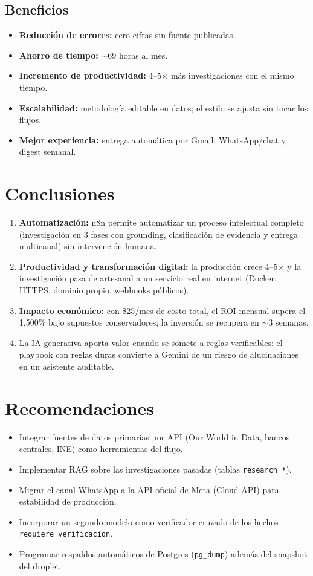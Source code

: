 \documentclass[11pt,a4paper]{article}
\newcommand{\code}[1]{\texttt{\small #1}}
\begin{document}
\subsection{Beneficios}
\begin{itemize}[leftmargin=1.4em]
\item \textbf{Reducción de errores:} cero cifras sin fuente publicadas.
\item \textbf{Ahorro de tiempo:} $\sim$69 horas al mes.
\item \textbf{Incremento de productividad:} 4--5$\times$ más investigaciones con el mismo tiempo.
\item \textbf{Escalabilidad:} metodología editable en datos; el estilo se ajusta sin tocar los flujos.
\item \textbf{Mejor experiencia:} entrega automática por Gmail, WhatsApp/chat y digest semanal.
\end{itemize}

\section{Conclusiones}
\begin{enumerate}[leftmargin=1.6em]
\item \textbf{Automatización:} n8n permite automatizar un proceso intelectual completo (investigación en 3 fases con grounding, clasificación de evidencia y entrega multicanal) sin intervención humana.
\item \textbf{Productividad y transformación digital:} la producción crece 4--5$\times$ y la investigación pasa de artesanal a un servicio real en internet (Docker, HTTPS, dominio propio, webhooks públicos).
\item \textbf{Impacto económico:} con \$25/mes de costo total, el ROI mensual supera el 1{,}500\% bajo supuestos conservadores; la inversión se recupera en $\sim$3 semanas.
\item La IA generativa aporta valor cuando se somete a reglas verificables: el playbook con reglas duras convierte a Gemini de un riesgo de alucinaciones en un asistente auditable.
\end{enumerate}

\section{Recomendaciones}
\begin{itemize}[leftmargin=1.4em]
\item Integrar fuentes de datos primarias por API (Our World in Data, bancos centrales, INE) como herramientas del flujo.
\item Implementar RAG sobre las investigaciones pasadas (tablas \code{research\_*}).
\item Migrar el canal WhatsApp a la API oficial de Meta (Cloud API) para estabilidad de producción.
\item Incorporar un segundo modelo como verificador cruzado de los hechos \code{requiere\_verificacion}.
\item Programar respaldos automáticos de Postgres (\code{pg\_dump}) además del snapshot del droplet.
\end{itemize}
\end{document}
